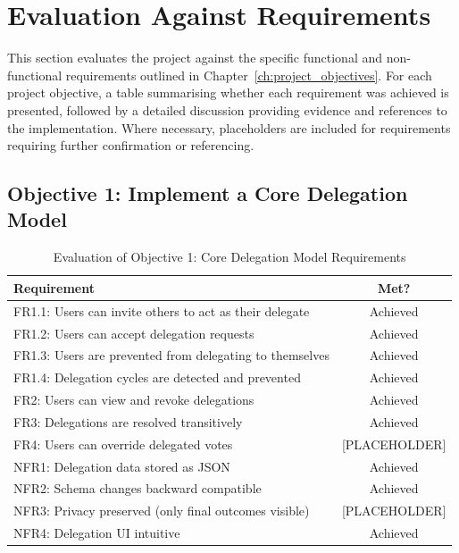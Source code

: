 \section{Evaluation Against Requirements}

This section evaluates the project against the specific functional and non-functional requirements outlined in Chapter~\ref{ch:project_objectives}. For each project objective, a table summarising whether each requirement was achieved is presented, followed by a detailed discussion providing evidence and references to the implementation. Where necessary, placeholders are included for requirements requiring further confirmation or referencing.

\subsection{Objective 1: Implement a Core Delegation Model}

\begin{table}[H]
\centering
\begin{tabular}{|p{9cm}|c|}
\hline
\textbf{Requirement} & \textbf{Met?} \\ \hline
FR1.1: Users can invite others to act as their delegate & Achieved \\ \hline
FR1.2: Users can accept delegation requests & Achieved \\ \hline
FR1.3: Users are prevented from delegating to themselves & Achieved \\ \hline
FR1.4: Delegation cycles are detected and prevented & Achieved \\ \hline
FR2: Users can view and revoke delegations & Achieved \\ \hline
FR3: Delegations are resolved transitively & Achieved \\ \hline
FR4: Users can override delegated votes & [PLACEHOLDER] \\ \hline
NFR1: Delegation data stored as JSON & Achieved \\ \hline
NFR2: Schema changes backward compatible & Achieved \\ \hline
NFR3: Privacy preserved (only final outcomes visible) & [PLACEHOLDER] \\ \hline
NFR4: Delegation UI intuitive & Achieved \\ \hline
\end{tabular}
\caption{Evaluation of Objective 1: Core Delegation Model Requirements}
\label{tab:objective1_requirements}
\end{table}

